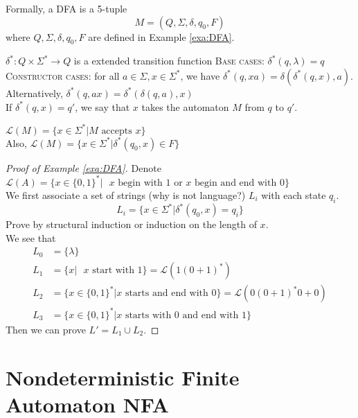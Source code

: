 \documentclass{aq-notes}
\begin{document}
\begin{definition}
    Formally, a DFA is a 5-tuple
    \[M = (Q,\Sigma,\delta, q_0,F)\]
    where $Q,\Sigma,\delta, q_0,F$ are defined in Example \ref{exa:DFA}.
\end{definition}
\begin{definition}
    $\delta^*: Q\times \Sigma^*\to Q$ is a extended transition function
    {\normalfont\scshape Base cases}: $\delta^*(q,\lambda) = q$\\
    {\normalfont\scshape Constructor cases}: for all $a\in \Sigma, x\in \Sigma^*$, we have $\delta^*(q,xa) = \delta(\delta^*(q,x),a)$.\\ 
    Alternatively, $\delta^*(q,ax) = \delta^*(\delta(q,a),x)$\\
    If $\delta^*(q,x)= q'$, we say that $x$ takes the automaton $M$ from $q$ to $q'$.
\end{definition}
\begin{definition}
    $\mathcal{L}(M) = \{x\in \Sigma^*| M \mbox{ accepts } x\}$\\
    Also, $\mathcal{L}(M) = \{x\in \Sigma^*| \delta^*(q_0,x)\in F \}$
\end{definition}
\begin{proof}[Proof of Example \ref{exa:DFA}]Denote
    $\mathcal{L}(A) = \{x\in \{0,1\}^*|\mbox{ $x$ begin with $1$ or $x$ begin and end with $0$} \}$\\
    We first associate a set of strings (why is not language?) $L_i$ with each state $q_i$.
    \[L_i = \{x\in \Sigma^*|\delta^*(q_0,x)= q_i\}\]
    Prove by structural induction or induction on the length of $x$.\\
    We see that
    \begin{align*}
        L_0 &= \{\lambda\}\\
        L_1 &= \{x|\mbox{ $x$ start with 1}\} = \mathcal{L}(1(0+1)^*)\\
        L_2 &= \{x\in\{0,1\}^*|\mbox{$x$ starts and end with 0}\} = \mathcal{L}(0(0+1)^*0+0)\\
        L_3 &= \{x\in\{0,1\}^*|\mbox{$x$ starts with 0 and end with 1}\}
    \end{align*}
    Then we can prove $L' = L_1\cup L_2$.
\end{proof}

\section{Nondeterministic Finite Automaton NFA}
\end{document}
